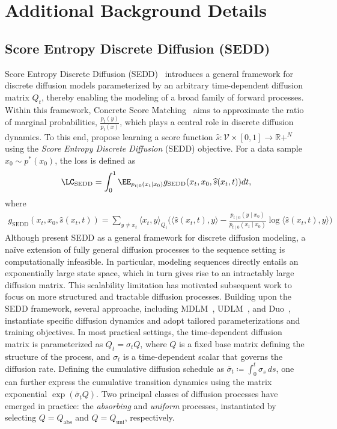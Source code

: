 \section{Additional Background Details}
\label{app:additional background details}
    \subsection{Score Entropy Discrete Diffusion (SEDD)}
        Score Entropy Discrete Diffusion (SEDD)~\citep{lou2024discrete} introduces a general framework for discrete diffusion models parameterized by an arbitrary time-dependent diffusion matrix $Q_t$, thereby enabling the modeling of a broad family of forward processes. Within this framework, Concrete Score Matching~\citep{meng2022concrete, lou2024discrete} aims to approximate the ratio of marginal probabilities, $\frac{p_t(y)}{p_t(x)}$, which plays a central role in discrete diffusion dynamics. To this end, \citet{lou2024discrete} propose learning a score function $\widehat{s} \colon \mathcal{V} \times [0,1] \to \mathbb{R}+^N$ using the \emph{Score Entropy Discrete Diffusion} (SEDD) objective. For a data sample $x_0 \sim p^*(x_0)$, the loss is defined as
        \begin{gather}
           \LC_{\text{SEDD}} = \int_0^1 \EE_{p_{t|0}(x_t|x_0)} g_{\text{SEDD}} (x_t, x_0, \widehat{s}(x_t, t)) dt,
           \nonumber 
        \end{gather}
        where
        \begin{gather}
        \label{eq:g sedd}
            g_{\text{SEDD}} (x_t, x_0, \widehat{s}(x_t, t)) = \sum_{y \neq x_t} \langle x_t, y \rangle_{Q_t} \biggl(\langle \widehat{s}(x_t,t), y\rangle - \frac{p_{t \mid 0}(y \mid x_0)}{p_{t \mid 0}(x_t \mid x_0)} \log  \langle \widehat{s}(x_t, t), y\rangle \biggr)
        \end{gather}
        Although \citet{lou2024discrete} present SEDD as a general framework for discrete diffusion modeling, a naïve extension of fully general diffusion processes to the sequence setting is computationally infeasible. In particular, modeling sequences directly entails an exponentially large state space, which in turn gives rise to an intractably large diffusion matrix. This scalability limitation has motivated subsequent work to focus on more structured and tractable diffusion processes. Building upon the SEDD framework, several approache, including MDLM~\citep{sahoo2024simple}, UDLM~\citep{schiff2024discreteguidance}, and Duo~\citep{sahoo2025the}, instantiate specific diffusion dynamics and adopt tailored parameterizations and training objectives. In most practical settings, the time-dependent diffusion matrix is parameterized as $Q_t = \sigma_t Q$, where $Q$ is a fixed base matrix defining the structure of the process, and $\sigma_t$ is a time-dependent scalar that governs the diffusion rate. Defining the cumulative diffusion schedule as $\overline{\sigma}_t \coloneqq \int_{0}^t \sigma_s \, ds$, one can further express the cumulative transition dynamics using the matrix exponential $\exp(\overline{\sigma}_t Q)$. Two principal classes of diffusion processes have emerged in practice: the \textit{absorbing} and \textit{uniform} processes, instantiated by selecting $Q = Q_{\text{abs}}$ and $Q = Q_{\text{uni}}$, respectively.
